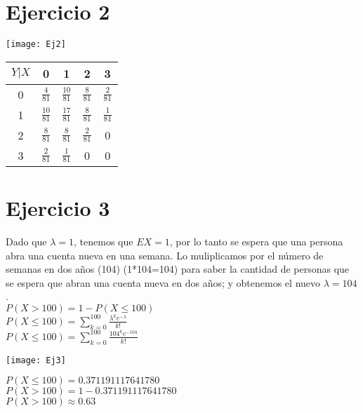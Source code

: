 \documentclass[15pt,a4paper]{article}
\begin{document}
\section{Ejercicio 2}

\begin{center}
\texttt{[image: Ej2]}
\end{center}

\begin{table}[ht]
\centering
\begin{tabular}{|c| c| c| c| c|}
\hline \hline
$Y|X$ & 0 & 1 & 2 & 3 \\
\hline
0 & $\frac{4}{81}$ & $\frac{10}{81}$  & $\frac{8}{81}$ & $\frac{2}{81}  $\\[5pt]
\hline
1 & $\frac{10}{81}$ & $\frac{17}{81}$  & $\frac{8}{81}$ & $\frac{1}{81}  $\\[5pt]
\hline
2 & $\frac{8}{81}$ & $\frac{8}{81}$  & $\frac{2}{81}$ & 0\\[5pt]
\hline
3 & $\frac{2}{81}$ & $\frac{1}{81}$  & 0 &  0\\[5pt]
\hline

\end{tabular}
\end{table}


\section{Ejercicio 3}
Dado que $\lambda =1$, tenemos que $EX = 1$, por lo tanto se espera que una persona abra una cuenta nueva en una semana. Lo muliplicamos por el número de semanas en dos años (104) (1*104=104) para saber la cantidad de personas que se espera que abran una cuenta nueva en dos años; y obtenemos el nuevo $\lambda = 104$.\\
$P(X>100) = 1 - P(X \le 100)$\\[10pt]
$P(X \le 100) = \sum_{k=0}^{100} \frac{\lambda^{k} e^{-\lambda}}{k!}$ \\[10pt]
$P(X \le 100) = \sum_{k=0}^{100} \frac{104^{k} e^{-104}}{k!}$ \\[10pt]

\begin{center}
\texttt{[image: Ej3]}
\end{center}
$P(X  \le 100) = 0.371191117641780$ \\[10pt]
$P(X>100) = 1 - 0.371191117641780$\\[10pt]
$P(X>100) \approx 0.63$
\end{document}

